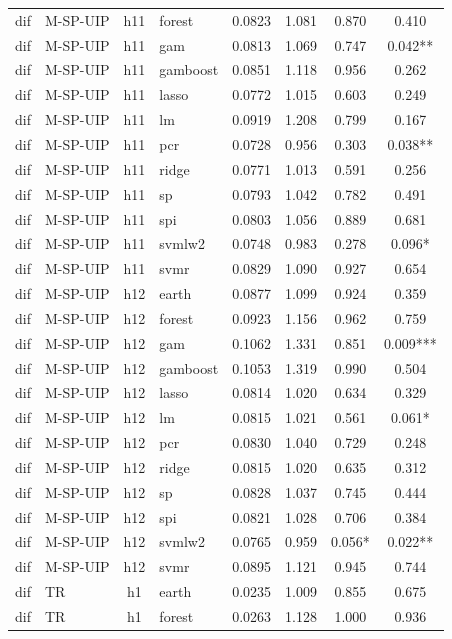\begin{ThreePartTable}
\begin{longtable}[t]{llclcccc}
dif & M-SP-UIP & h11 & forest & 0.0823 & 1.081 & 0.870 & 0.410\\
dif & M-SP-UIP & h11 & gam & 0.0813 & 1.069 & 0.747 & 0.042**\\
dif & M-SP-UIP & h11 & gamboost & 0.0851 & 1.118 & 0.956 & 0.262\\
dif & M-SP-UIP & h11 & lasso & 0.0772 & 1.015 & 0.603 & 0.249\\
dif & M-SP-UIP & h11 & lm & 0.0919 & 1.208 & 0.799 & 0.167\\
dif & M-SP-UIP & h11 & pcr & 0.0728 & 0.956 & 0.303 & 0.038**\\
dif & M-SP-UIP & h11 & ridge & 0.0771 & 1.013 & 0.591 & 0.256\\
dif & M-SP-UIP & h11 & sp & 0.0793 & 1.042 & 0.782 & 0.491\\
dif & M-SP-UIP & h11 & spi & 0.0803 & 1.056 & 0.889 & 0.681\\
dif & M-SP-UIP & h11 & svmlw2 & 0.0748 & 0.983 & 0.278 & 0.096*\\
dif & M-SP-UIP & h11 & svmr & 0.0829 & 1.090 & 0.927 & 0.654\\
\addlinespace
dif & M-SP-UIP & h12 & earth & 0.0877 & 1.099 & 0.924 & 0.359\\
dif & M-SP-UIP & h12 & forest & 0.0923 & 1.156 & 0.962 & 0.759\\
dif & M-SP-UIP & h12 & gam & 0.1062 & 1.331 & 0.851 & 0.009***\\
dif & M-SP-UIP & h12 & gamboost & 0.1053 & 1.319 & 0.990 & 0.504\\
dif & M-SP-UIP & h12 & lasso & 0.0814 & 1.020 & 0.634 & 0.329\\
dif & M-SP-UIP & h12 & lm & 0.0815 & 1.021 & 0.561 & 0.061*\\
dif & M-SP-UIP & h12 & pcr & 0.0830 & 1.040 & 0.729 & 0.248\\
dif & M-SP-UIP & h12 & ridge & 0.0815 & 1.020 & 0.635 & 0.312\\
dif & M-SP-UIP & h12 & sp & 0.0828 & 1.037 & 0.745 & 0.444\\
dif & M-SP-UIP & h12 & spi & 0.0821 & 1.028 & 0.706 & 0.384\\
dif & M-SP-UIP & h12 & svmlw2 & 0.0765 & 0.959 & 0.056* & 0.022**\\
dif & M-SP-UIP & h12 & svmr & 0.0895 & 1.121 & 0.945 & 0.744\\
\addlinespace
dif & TR & h1 & earth & 0.0235 & 1.009 & 0.855 & 0.675\\
dif & TR & h1 & forest & 0.0263 & 1.128 & 1.000 & 0.936\\

\end{longtable}
\end{ThreePartTable}
